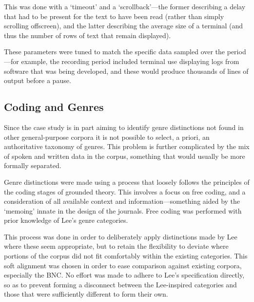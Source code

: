 This was done with a `timeout' and a `scrollback'---the former describing a delay that had to be present for the text to have been read (rather than simply scrolling offscreen), and the latter describing the average size of a terminal (and thus the number of rows of text that remain displayed).

These parameters were tuned to match the specific data sampled over the period---for example, the recording period included terminal use displaying logs from software that was being developed, and these would produce thousands of lines of output before a pause.




\subsection{Coding and Genres}
Since the case study is in part aiming to identify genre distinctions not found in other general-purpose corpora it is not possible to select, a priori, an authoritative taxonomy of genres.  This problem is further complicated by the mix of spoken and written data in the corpus, something that would usually be more formally separated.


Genre distinctions were made using a process that loosely follows the principles of the coding stages of grounded theory\cite{glaser1992emergence}.  
This involves a focus on free coding, and a consideration of all available context and information---something aided by the `memoing' innate in the design of the journals.  Free coding was performed with prior knowledge of Lee's genre categories.


This process was done in order to deliberately apply distinctions made by Lee where these seem appropriate, but to retain the flexibility to deviate where portions of the corpus did not fit comfortably within the existing categories.  This soft alignment was chosen in order to ease comparison against existing corpora, especially the BNC\@.  No effort was made to adhere to Lee's specification directly, so as to prevent forming a disconnect between the Lee-inspired categories and those that were sufficiently different to form their own.



